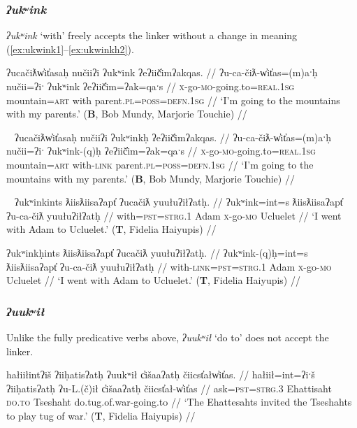 \subsubsection{\textit{ʔukʷink}} \label{ch:link:ukwink} \textit{ʔukʷink} `with' freely accepts the linker without a change in meaning (\ref{ex:ukwink1}--\ref{ex:ukwinkh2}).

\ex \label{ex:ukwink1}
\begingl
\glpreamble ʔucačiƛw̓it̓asaḥ nučiiʔi ʔukʷink ʔeʔiič̓imʔakqas. //
\gla ʔu-ca-čiƛ-w̓it̓as=(m)aˑḥ nučii=ʔiˑ ʔukʷink ʔeʔiič̓im=ʔak=qaˑs //
\glb \textsc{x}-go-\textsc{mo}-going.to=\textsc{real.1sg} mountain=\textsc{art} with parent.\textsc{pl}=\textsc{poss}=\textsc{defn.1sg} //
\glft `I'm going to the mountains with my parents.' (\textbf{B}, Bob Mundy, Marjorie Touchie) //
\endgl
\xe

\ex~ \label{ex:ukwinkh1}
\begingl
\glpreamble ʔucačiƛw̓it̓asaḥ nučiiʔi ʔukʷinkḥ ʔeʔiič̓imʔakqas. //
\gla ʔu-ca-čiƛ-w̓it̓as=(m)aˑḥ nučii=ʔiˑ ʔukʷink-(q)ḥ ʔeʔiič̓im=ʔak=qaˑs //
\glb \textsc{x}-go-\textsc{mo}-going.to=\textsc{real.1sg} mountain=\textsc{art} with-\textsc{link} parent.\textsc{pl}=\textsc{poss}=\textsc{defn.1sg} //
\glft `I'm going to the mountains with my parents.' (\textbf{B}, Bob Mundy, Marjorie Touchie) //
\endgl
\xe

\ex~ \label{ex:ukwink2}
\begingl
\glpreamble ʔukʷinkints ƛiisƛiisaʔapt̓ ʔucačiƛ yuułuʔiłʔatḥ. //
\gla ʔukʷink=int=s ƛiisƛiisaʔapt̓ ʔu-ca-čiƛ yuułuʔiłʔatḥ //
\glb with=\textsc{pst}=\textsc{strg.1} Adam \textsc{x}-go-\textsc{mo} Ucluelet //
\glft `I went with Adam to Ucluelet.' (\textbf{T}, Fidelia Haiyupis) //
\endgl
\xe

\ex \label{ex:ukwinkh2}
\begingl
\glpreamble ʔukʷinkḥints ƛiisƛiisaʔapt̓ ʔucačiƛ yuułuʔiłʔatḥ. //
\gla ʔukʷink-(q)ḥ=int=s ƛiisƛiisaʔapt̓ ʔu-ca-čiƛ yuułuʔiłʔatḥ //
\glb with-\textsc{link}=\textsc{pst}=\textsc{strg.1} Adam \textsc{x}-go-\textsc{mo} Ucluelet //
\glft `I went with Adam to Ucluelet.' (\textbf{T}, Fidelia Haiyupis) //
\endgl
\xe

\subsubsection{\textit{ʔuukʷił}} \label{ch:link:uukwil} Unlike the fully predicative verbs above, \textit{ʔuukʷił} `do to' does not accept the linker.

\ex \label{ex:tugofwar1}
\begingl
\glpreamble hałiiłintʔiš ʔiiḥatisʔatḥ ʔuukʷił c̓išaaʔatḥ čiicst̓ałw̓it̓as. //
\gla hałiił=int=ʔiˑš ʔiiḥatisʔatḥ ʔu-L.(č)ił c̓išaaʔatḥ čiicst̓ał-w̓it̓as //
\glb ask=\textsc{pst}=\textsc{strg.3} Ehattisaht \textsc{do.to} Tseshaht do.tug.of.war-going.to //
\glft `The Ehattesahts invited the Tseshahts to play tug of war.' (\textbf{T}, Fidelia Haiyupis) //
\endgl
\xe

